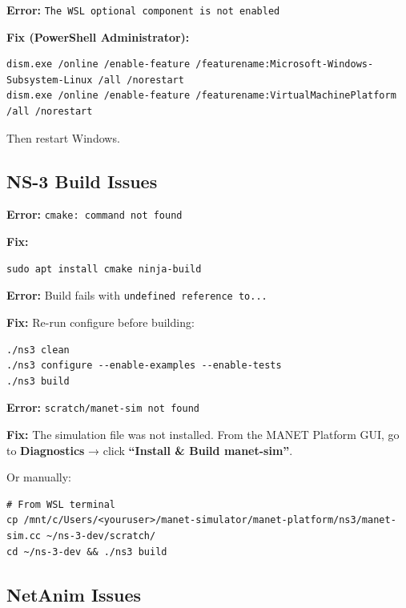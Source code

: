 \documentclass[12pt,a4paper]{article}
\newenvironment{errorbox}
  {\begin{tcolorbox}[
      colback   = dangered!8,
      colframe  = dangered,
      fonttitle = \bfseries,
      title     = \textcolor{dangered}{$\times$\; Error / Fix},
      breakable
  ]}
  {\end{tcolorbox}}
\begin{document}
\begin{errorbox}
\textbf{Error:} \texttt{The WSL optional component is not enabled}

\textbf{Fix (PowerShell Administrator):}
\begin{lstlisting}[style=bash]
dism.exe /online /enable-feature /featurename:Microsoft-Windows-Subsystem-Linux /all /norestart
dism.exe /online /enable-feature /featurename:VirtualMachinePlatform /all /norestart
\end{lstlisting}
Then restart Windows.
\end{errorbox}

\subsection{NS-3 Build Issues}

\begin{errorbox}
\textbf{Error:} \texttt{cmake: command not found}

\textbf{Fix:}
\begin{lstlisting}[style=bash]
sudo apt install cmake ninja-build
\end{lstlisting}
\end{errorbox}

\begin{errorbox}
\textbf{Error:} Build fails with \texttt{undefined reference to...}

\textbf{Fix:} Re-run configure before building:
\begin{lstlisting}[style=bash]
./ns3 clean
./ns3 configure --enable-examples --enable-tests
./ns3 build
\end{lstlisting}
\end{errorbox}

\begin{errorbox}
\textbf{Error:} \texttt{scratch/manet-sim not found}

\textbf{Fix:} The simulation file was not installed. From the MANET Platform GUI, go to \textbf{Diagnostics} → click \textbf{``Install \& Build manet-sim''}.

Or manually:
\begin{lstlisting}[style=bash]
# From WSL terminal
cp /mnt/c/Users/<youruser>/manet-simulator/manet-platform/ns3/manet-sim.cc ~/ns-3-dev/scratch/
cd ~/ns-3-dev && ./ns3 build
\end{lstlisting}
\end{errorbox}

\subsection{NetAnim Issues}
\end{document}
